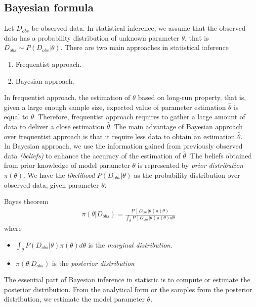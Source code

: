 \subsection{Bayesian formula}
Let $D_{obs}$ be observed data. In statistical inference, we assume that the observed data has a
probability distribution of unknown parameter $\theta$, that is $D_{obs} \sim P(D_{obs}|\theta)$. There are two main approaches in statistical inference
\begin{enumerate}
      \item Frequentist approach.
      \item Bayesian approach.
\end{enumerate}
In frequentist approach, the estimation of $\theta$ based on long-run property, that is, given a
large enough sample size, expected value of parameter estimation $\hat{\theta}$ is equal to
$\theta$. Therefore, frequentist approach requires to gather a large amount of data to deliver a
close estimation $\hat{\theta}$.  The main advantage of Bayesian approach over frequentist approach
is that it require less data to obtain an estimation $\hat{\theta}$.\\
In Bayesian approach, we use the information gained from previously observed data \textit{(beliefs)}
to enhance the accuracy of the estimation of $\hat{\theta}$. The beliefs obtained from prior
knowledge of model parameter $\theta$ is represented by \textit{prior distribution} $\pi(\theta)$.
We have the \textit{likelihood} $P(D_{obs}|\theta)$ as the probability distribution over observed
data, given parameter $\theta$.
\begin{definition}{Bayes theorem}
      \begin{align*}
            \pi(\theta | D_{obs}) = \frac{P(D_{obs}|\theta)\pi(\theta)}{\int_\theta P(D_{obs}|\theta)\pi(\theta)d\theta}
      \end{align*}
      where
      \begin{itemize}
            \item $\int_\theta P(D_{obs}|\theta)\pi(\theta)d\theta$ is the \textit{marginal distribution}.
            \item $\pi(\theta | D_{obs})$ is the \textit{posterior distribution}
      \end{itemize}
\end{definition}
The essential part of Bayesian inference in statistic is to compute or estimate the posterior
distribution. From the analytical form or the samples from the posterior distribution, we estimate
the model parameter $\theta$.

